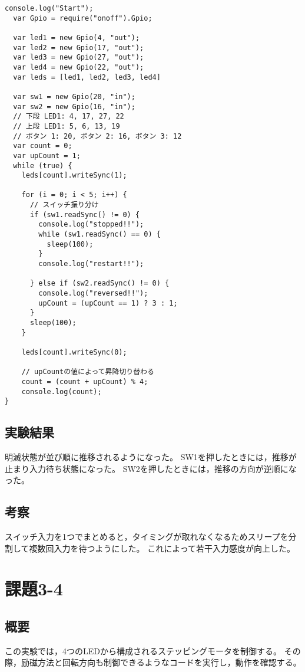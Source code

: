 \documentclass[a4paper,10pt]{jsarticle}
\begin{document}
\begin{lstlisting}[caption={program3-3},label={program3-3}]
  console.log("Start");
  var Gpio = require("onoff").Gpio;

  var led1 = new Gpio(4, "out");
  var led2 = new Gpio(17, "out");
  var led3 = new Gpio(27, "out");
  var led4 = new Gpio(22, "out");
  var leds = [led1, led2, led3, led4]

  var sw1 = new Gpio(20, "in");
  var sw2 = new Gpio(16, "in");
  // 下段 LED1: 4, 17, 27, 22
  // 上段 LED1: 5, 6, 13, 19
  // ボタン 1: 20, ボタン 2: 16, ボタン 3: 12
  var count = 0;
  var upCount = 1;
  while (true) {
    leds[count].writeSync(1);

    for (i = 0; i < 5; i++) {
      // スイッチ振り分け
      if (sw1.readSync() != 0) {
        console.log("stopped!!");
        while (sw1.readSync() == 0) {
          sleep(100);
        }
        console.log("restart!!");

      } else if (sw2.readSync() != 0) {
        console.log("reversed!!");
        upCount = (upCount == 1) ? 3 : 1;
      }
      sleep(100);
    }

    leds[count].writeSync(0);

    // upCountの値によって昇降切り替わる
    count = (count + upCount) % 4;
    console.log(count);
}
\end{lstlisting}

\subsection{実験結果}
明滅状態が並び順に推移されるようになった。
SW1を押したときには，推移が止まり入力待ち状態になった。
SW2を押したときには，推移の方向が逆順になった。

\subsection{考察}
スイッチ入力を1つでまとめると，タイミングが取れなくなるためスリープを分割して複数回入力を待つようにした。
これによって若干入力感度が向上した。

\section{課題3-4}
\subsection{概要}
この実験では，4つのLEDから構成されるステッピングモータを制御する。
その際，励磁方法と回転方向も制御できるようなコードを実行し，動作を確認する。
\end{document}
